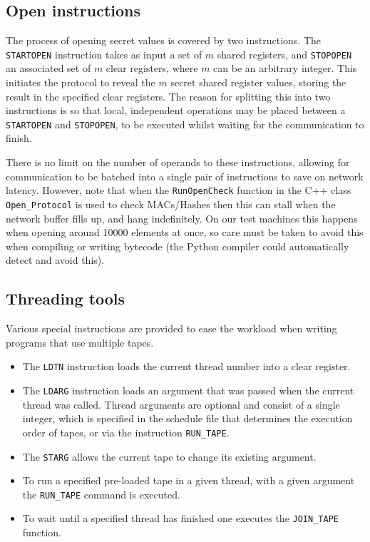\subsection{Open instructions}

The process of opening secret values is covered by two instructions.
The \verb+STARTOPEN+ instruction takes as input a set of $m$
shared registers, and \verb+STOPOPEN+ an associated set of $m$
clear registers, where $m$ can be an arbitrary integer.
This initiates the protocol to reveal the $m$ secret shared register values,
storing the result in the specified clear registers. The reason for
splitting this into two instructions is so that local, independent
operations may be placed between a \verb+STARTOPEN+ and \verb+STOPOPEN+,
to be executed whilst waiting for the communication to finish.

There is no limit on the number of operands to these instructions,
allowing for communication to be batched into a single pair of
instructions to save on network latency. However, note that when
the \texttt{RunOpenCheck} function in the C++ class \texttt{Open\_Protocol}
is used to check MACs/Hashes then this can stall when the network buffer fills 
up, and hang indefinitely.
On our test machines this happens when opening around 10000 elements
at once, so care must be taken to avoid this when compiling or writing
bytecode (the Python compiler could automatically detect and avoid
this).

\subsection{Threading tools}
Various special instructions are provided to ease the workload when writing
programs that use multiple tapes. 
\begin{itemize}
\item The \verb+LDTN+ instruction loads the current thread number into 
a clear register.
\item The \verb+LDARG+ instruction loads an argument that was passed 
when the current thread was called.
Thread arguments are optional and consist of a single integer, 
which is specified in the schedule file that determines the execution 
order of tapes, or via the instruction \verb+RUN_TAPE+.
\item The \verb+STARG+ allows the current tape to change its
existing argument.
\item To run a specified pre-loaded tape in a given thread, with
a given argument the \verb+RUN_TAPE+ command is executed.
\item To wait until a specified thread has finished one executes
the \verb+JOIN_TAPE+ function.
\end{itemize}


